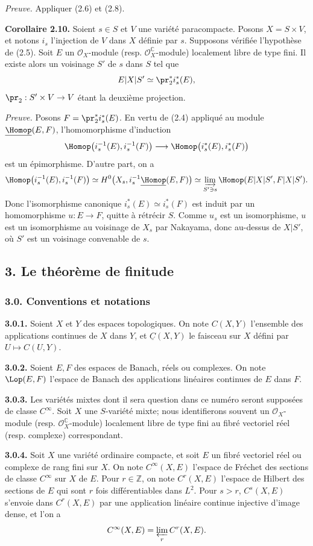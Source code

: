 \documentclass[11pt]{article}
\providecommand{\Z}{\mathbb Z}
\providecommand{\cO}{\mathcal O}
\begin{document}
\emph{Preuve.} Appliquer (2.6) et (2.8).

\textbf{Corollaire 2.10.} Soient $s\in S$ et $V$ une variété paracompacte. Posons $X=S\times V$, et notons $i_s$ l'injection de $V$ dans $X$ définie par $s$. Supposons vérifiée l'hypothèse de (2.5). Soit $E$ un $\cO_X$-module (resp. $\cO_X^\mathbb C$-module) localement libre de type fini. Il existe alors un voisinage $S'$ de $s$ dans $S$ tel que
\[
  E|X|S'\simeq \pr_2^*i_s^*(E),
\]
$\pr_2:S'\times V\to V$ étant la deuxième projection.

\emph{Preuve.} Posons $F=\pr_2^*i_s^*(E)$. En vertu de (2.4) appliqué au module $\underline{\Homop}(E,F)$, l'homomorphisme d'induction
\[
  \Homop\bigl(i_s^{-1}(E),i_s^{-1}(F)\bigr)
  \longrightarrow
  \Homop\bigl(i_s^*(E),i_s^*(F)\bigr)
\]
est un épimorphisme. D'autre part, on a
\[
  \Homop\bigl(i_s^{-1}(E),i_s^{-1}(F)\bigr)
  \simeq H^0\bigl(X_s,i_s^{-1}\underline{\Homop}(E,F)\bigr)
  \simeq \varinjlim_{S'\ni s}\Homop(E|X|S',F|X|S').
\]
Donc l'isomorphisme canonique $i_s^*(E)\simeq i_s^*(F)$ est induit par un homomorphisme $u:E\to F$, quitte à rétrécir $S$. Comme $u_s$ est un isomorphisme, $u$ est un isomorphisme au voisinage de $X_s$ par Nakayama, donc au-dessus de $X|S'$, où $S'$ est un voisinage convenable de $s$.

\subsection*{3. Le théorème de finitude}

\subsubsection*{3.0. Conventions et notations}
\textbf{3.0.1.} Soient $X$ et $Y$ des espaces topologiques. On note $C(X,Y)$ l'ensemble des applications continues de $X$ dans $Y$, et $\underline C(X,Y)$ le faisceau sur $X$ défini par $U\mapsto C(U,Y)$.

\textbf{3.0.2.} Soient $E,F$ des espaces de Banach, réels ou complexes. On note $\Lop(E,F)$ l'espace de Banach des applications linéaires continues de $E$ dans $F$.

\textbf{3.0.3.} Les variétés mixtes dont il sera question dans ce numéro seront supposées de classe $C^\infty$. Soit $X$ une $S$-variété mixte; nous identifierons souvent un $\cO_X$-module (resp. $\cO_X^\mathbb C$-module) localement libre de type fini au fibré vectoriel réel (resp. complexe) correspondant.

\textbf{3.0.4.} Soit $X$ une variété ordinaire compacte, et soit $E$ un fibré vectoriel réel ou complexe de rang fini sur $X$. On note $C^\infty(X,E)$ l'espace de Fréchet des sections de classe $C^\infty$ sur $X$ de $E$. Pour $r\in\Z$, on note $C^r(X,E)$ l'espace de Hilbert des sections de $E$ qui sont $r$ fois différentiables dans $L^2$. Pour $s>r$, $C^s(X,E)$ s'envoie dans $C^r(X,E)$ par une application linéaire continue injective d'image dense, et l'on a
\[
  C^\infty(X,E)=\varprojlim_r C^r(X,E).
\]
\end{document}
